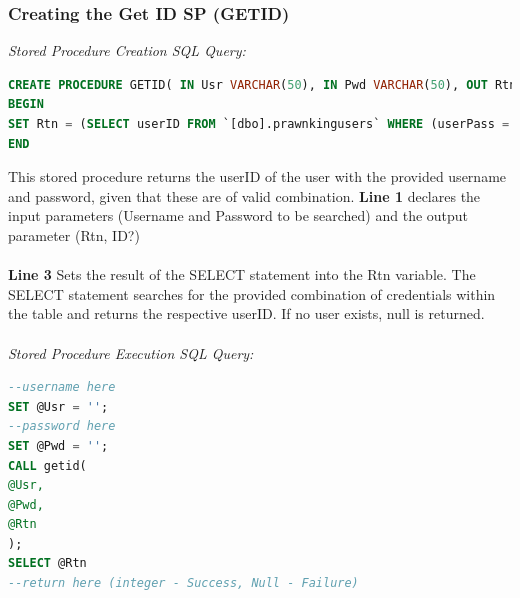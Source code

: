 \documentclass[a4paper,11pt]{proc}
\begin{document}
\subsubsection{Creating the Get ID SP (GETID)}
\textit{Stored Procedure Creation SQL Query:}
\begin{lstlisting}[language=SQL,
deletekeywords={IDENTITY,INT},
morekeywords={clustered,OUT, BEGIN, PROCEDURE},    
framesep=10pt,
framextopmargin=10pt]
CREATE PROCEDURE GETID( IN Usr VARCHAR(50), IN Pwd VARCHAR(50), OUT Rtn INT )
BEGIN
SET Rtn = (SELECT userID FROM `[dbo].prawnkingusers` WHERE (userPass = Pwd AND userName = Usr));
END
\end{lstlisting}
This stored procedure returns the userID of the user with the provided username and password, given that these are of valid combination. \textbf{Line 1} declares the input parameters (Username and Password to be searched) and the output parameter (Rtn, ID?)\\
\\\textbf{Line 3} Sets the result of the SELECT statement into the Rtn variable. The SELECT statement searches for the provided combination of credentials within the table and returns the respective userID. If no user exists, null is returned.\\
\\\textit{Stored Procedure Execution SQL Query:}
\begin{lstlisting}[language=SQL,
deletekeywords={IDENTITY,INT},
morekeywords={clustered,OUT, BEGIN, PROCEDURE,CALL},    
framesep=10pt,
framextopmargin=10pt]
--username here
SET @Usr = '';
--password here
SET @Pwd = '';
CALL getid(
@Usr,
@Pwd,
@Rtn
);
SELECT @Rtn
--return here (integer - Success, Null - Failure)
\end{lstlisting}
\end{document}
